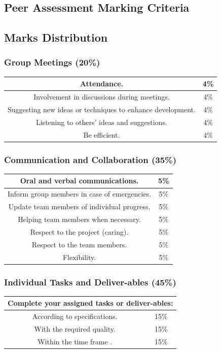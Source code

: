 \documentclass{article}
\begin{document}
\begin{appendices}
\newpage
\section{Peer Assessment Marking Criteria}
\subsection{Marks Distribution}
\subsubsection{Group Meetings (20\%{})}
 \begin{tabular} {| c | c |}
  \hline
  Attendance. & 4\%{} \\
  \hline
  Involvement in discussions during meetings. & 4\%{} \\
  \hline
  Suggesting new ideas or techniques to enhance development. & 4\%{} \\
  \hline
  Listening to others’ ideas and suggestions. & 4\%{} \\
  \hline
  Be efficient. & 4\%{} \\
  \hline
 \end{tabular}

\subsubsection{Communication and Collaboration (35\%{})}
 \begin{tabular} {| c | c |}
  \hline
  Oral and verbal communications. & 5\%{} \\
  \hline
  Inform group members in case of emergencies. & 5\%{} \\
  \hline
  Update team members of individual progress. & 5\%{} \\
  \hline
  Helping team members when necessary. & 5\%{} \\
  \hline
  Respect to the project (caring). & 5\%{} \\
  \hline
  Respect to the team members. & 5\%{} \\
  \hline
  Flexibility. & 5\%{}\\
  \hline
 \end{tabular}

\subsubsection{Individual Tasks and Deliver-ables (45\%{})}
 \begin{tabular} {| c | c |}
  \hline
  \multicolumn{2}{|c|}{Complete your assigned tasks or deliver-ables:} \\
  \hline
  According to specifications. & 15\%{} \\
  \hline
  With the required quality. & 15\%{} \\
  \hline
  Within the time frame . & 15\%{} \\
  \hline
\end{tabular}


\end{appendices}
\end{document}
